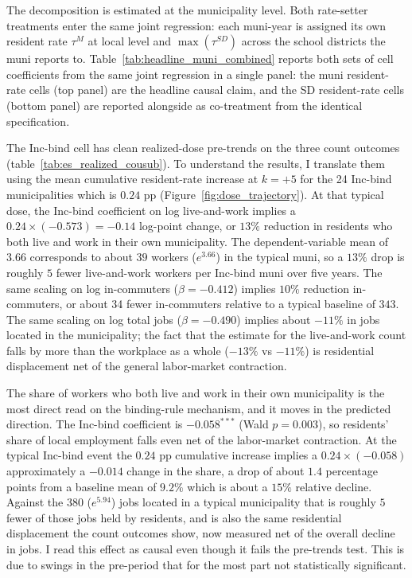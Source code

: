 \documentclass[12pt]{article}
\begin{document}
The decomposition is estimated at the municipality level. Both
rate-setter treatments enter the same joint regression: each
muni-year is assigned its own resident rate $\tau^M$ at local
level and $\max(\tau^{SD})$ across the school districts the muni
reports to. Table~\ref{tab:headline_muni_combined}
reports both sets of cell coefficients from the same joint
regression in a single panel: the muni resident-rate cells (top
panel) are the headline causal claim, and the SD resident-rate
cells (bottom panel) are reported alongside as co-treatment from
the identical specification.



The Inc-bind cell has clean realized-dose pre-trends on the three
count outcomes (table~\ref{tab:es_realized_cousub}). To understand the results, I translate them using the mean cumulative resident-rate increase at
$k=+5$ for the 24 Inc-bind municipalities which is $0.24$ pp
(Figure~\ref{fig:dose_trajectory}). At that typical dose, the
Inc-bind coefficient on log live-and-work implies a
$0.24\times(-0.573)=-0.14$ log-point change, or $13\%$ reduction in
residents who both live and work in their own municipality. The
dependent-variable mean of $3.66$ corresponds to about $39$ workers ($e^{3.66}$) in the typical muni, so a $13\%$ drop is
roughly $5$ fewer live-and-work workers per Inc-bind muni over
five years. The same scaling on log in-commuters
($\beta=-0.412$) implies $10\%$ reduction in-commuters, or about 34 fewer
in-commuters relative to a typical baseline of
$343$. The same scaling on log total jobs ($\beta=-0.490$) implies
about $-11\%$ in jobs located in the municipality; the fact that the estimate for the
live-and-work count falls by more than the workplace as a whole
($-13\%$ vs $-11\%$) is residential displacement net of the general
labor-market contraction.

The share of workers who both live and work in their own
municipality is the most direct read on the binding-rule mechanism,
and it moves in the predicted direction. The Inc-bind coefficient is
$-0.058^{***}$ (Wald $p=0.003$), so residents' share of local
employment falls even net of the labor-market contraction. At the
typical Inc-bind event the $0.24$ pp cumulative increase implies a
$0.24\times(-0.058)$ approximately a $-0.014$ change in the share, a drop of
about $1.4$ percentage points from a baseline mean of $9.2\%$ which is about a
$15\%$ relative decline. Against the $380$ ($e^{5.94}$) jobs
located in a typical municipality that is roughly $5$ fewer of those
jobs held by residents, and is also the same residential displacement the count
outcomes show, now measured net of the overall decline in jobs. I read this effect as causal even though it fails the pre-trends test. This is due to swings in the pre-period that for the most part not statistically significant. 
\end{document}
